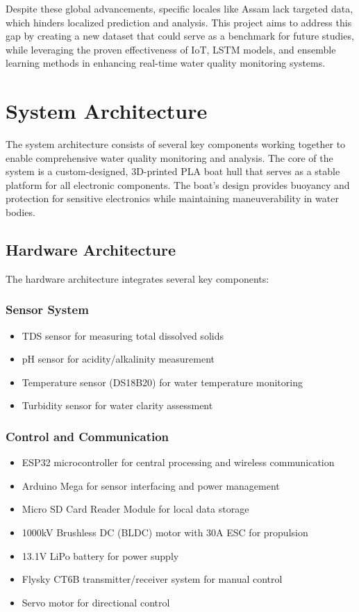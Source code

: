 \documentclass[conference]{IEEEtran}
\begin{document}
Despite these global advancements, specific locales like Assam lack targeted data, which hinders localized prediction and analysis. This project aims to address this gap by creating a new dataset that could serve as a benchmark for future studies, while leveraging the proven effectiveness of IoT, LSTM models, and ensemble learning methods in enhancing real-time water quality monitoring systems.

\section{System Architecture}
The system architecture consists of several key components working together to enable comprehensive water quality monitoring and analysis. The core of the system is a custom-designed, 3D-printed PLA boat hull that serves as a stable platform for all electronic components. The boat's design provides buoyancy and protection for sensitive electronics while maintaining maneuverability in water bodies.

\subsection{Hardware Architecture}
The hardware architecture integrates several key components:

\subsubsection{Sensor System}
\begin{itemize}
\item TDS sensor for measuring total dissolved solids
\item pH sensor for acidity/alkalinity measurement
\item Temperature sensor (DS18B20) for water temperature monitoring
\item Turbidity sensor for water clarity assessment
\end{itemize}

\subsubsection{Control and Communication}
\begin{itemize}
\item ESP32 microcontroller for central processing and wireless communication
\item Arduino Mega for sensor interfacing and power management
\item Micro SD Card Reader Module for local data storage
\item 1000kV Brushless DC (BLDC) motor with 30A ESC for propulsion
\item 13.1V LiPo battery for power supply
\item Flysky CT6B transmitter/receiver system for manual control
\item Servo motor for directional control
\end{itemize}
\end{document}
